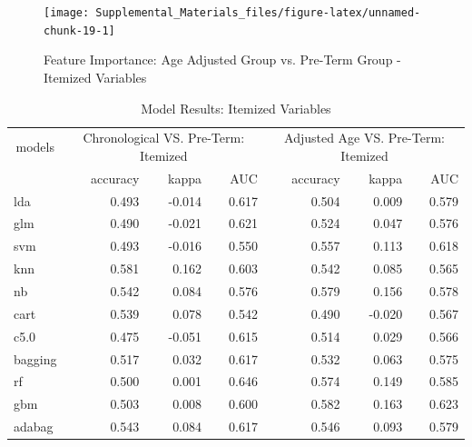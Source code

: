 \documentclass[
]{article}
\begin{document}
\newpage

\begin{figure}

{\centering \texttt{[image: Supplemental\_Materials\_files/figure-latex/unnamed-chunk-19-1]} 

}

\caption{Feature Importance: Age Adjusted Group vs. Pre-Term Group - Itemized Variables}\label{fig:unnamed-chunk-19}
\end{figure}

\newpage

\begin{table}

\caption{\label{tab:unnamed-chunk-21}Model Results: Itemized Variables}
\fontsize{12}{14}\selectfont
\begin{tabular}[t]{l|r|r|r|r|r|r}
\hline
\multicolumn{1}{c|}{models} & \multicolumn{3}{c|}{Chronological VS. Pre-Term: Itemized} & \multicolumn{3}{c}{Adjusted Age VS. Pre-Term: Itemized} \\
\cline{1-1} \cline{2-4} \cline{5-7}
  & accuracy & kappa & AUC & accuracy & kappa & AUC\\
\hline
lda & 0.493 & -0.014 & 0.617 & 0.504 & 0.009 & 0.579\\
\hline
glm & 0.490 & -0.021 & 0.621 & 0.524 & 0.047 & 0.576\\
\hline
svm & 0.493 & -0.016 & 0.550 & 0.557 & 0.113 & 0.618\\
\hline
knn & 0.581 & 0.162 & 0.603 & 0.542 & 0.085 & 0.565\\
\hline
nb & 0.542 & 0.084 & 0.576 & 0.579 & 0.156 & 0.578\\
\hline
cart & 0.539 & 0.078 & 0.542 & 0.490 & -0.020 & 0.567\\
\hline
c5.0 & 0.475 & -0.051 & 0.615 & 0.514 & 0.029 & 0.566\\
\hline
bagging & 0.517 & 0.032 & 0.617 & 0.532 & 0.063 & 0.575\\
\hline
rf & 0.500 & 0.001 & 0.646 & 0.574 & 0.149 & 0.585\\
\hline
gbm & 0.503 & 0.008 & 0.600 & 0.582 & 0.163 & 0.623\\
\hline
adabag & 0.543 & 0.084 & 0.617 & 0.546 & 0.093 & 0.579\\
\hline
\end{tabular}
\end{table}

\newpage
\end{document}
